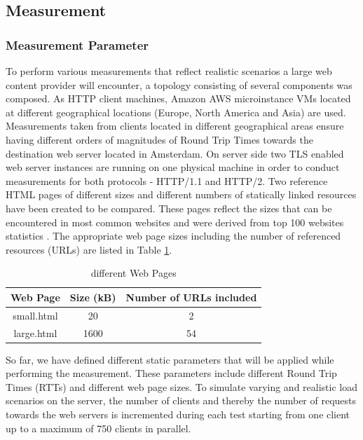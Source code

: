 \subsection{Measurement}
\subsubsection{Measurement Parameter}
\label{subsec:measurements}
To perform various measurements that reflect realistic scenarios a large web content provider will encounter, a topology consisting of several components was composed. As HTTP client machines, Amazon AWS microinstance VMs \cite{amazon} located at different geographical locations (Europe, North America and Asia) are used. Measurements taken from clients located in different geographical areas ensure having different orders of magnitudes of Round Trip Times towards the destination web server located in Amsterdam. On server side two TLS enabled web server instances are running on one physical machine in order to conduct measurements for both protocols - HTTP/1.1 and HTTP/2. Two reference HTML pages of different sizes and different numbers of statically linked resources have been created to be compared. These pages reflect the sizes that can be encountered in most common websites and were derived from top 100 websites statistics \cite{httparchive}. The appropriate web page sizes including the number of referenced resources (URLs) are listed in Table \ref{table:pages}.

\begin{table}[h]
	\centering
\begin{tabular}{ | c | c | c | }

\hline
\textbf{Web Page} & \textbf{Size (kB)} & \textbf{Number of URLs included}\\ \hline \hline
small.html &  20 & 2 \\ \hline
large.html &  1600 & 54 \\
\hline
\end{tabular}
\caption{different Web Pages}
\label{table:pages}
\end{table}

So far, we have defined different static parameters that will be applied while performing the measurement. These parameters include different Round Trip Times (RTTs) and different web page sizes.  
To simulate varying and realistic load scenarios on the server, the number of clients and thereby the number of requests towards the web servers is incremented during each test starting from one client up to a maximum of 750 clients in parallel.
\\  
